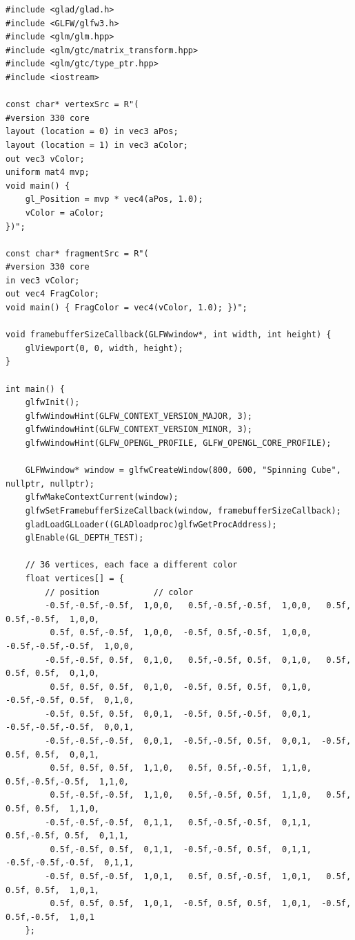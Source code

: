 \documentclass[11pt,a4paper]{article}
\begin{document}
\begin{lstlisting}
#include <glad/glad.h>
#include <GLFW/glfw3.h>
#include <glm/glm.hpp>
#include <glm/gtc/matrix_transform.hpp>
#include <glm/gtc/type_ptr.hpp>
#include <iostream>

const char* vertexSrc = R"(
#version 330 core
layout (location = 0) in vec3 aPos;
layout (location = 1) in vec3 aColor;
out vec3 vColor;
uniform mat4 mvp;
void main() {
    gl_Position = mvp * vec4(aPos, 1.0);
    vColor = aColor;
})";

const char* fragmentSrc = R"(
#version 330 core
in vec3 vColor;
out vec4 FragColor;
void main() { FragColor = vec4(vColor, 1.0); })";

void framebufferSizeCallback(GLFWwindow*, int width, int height) {
    glViewport(0, 0, width, height);
}

int main() {
    glfwInit();
    glfwWindowHint(GLFW_CONTEXT_VERSION_MAJOR, 3);
    glfwWindowHint(GLFW_CONTEXT_VERSION_MINOR, 3);
    glfwWindowHint(GLFW_OPENGL_PROFILE, GLFW_OPENGL_CORE_PROFILE);

    GLFWwindow* window = glfwCreateWindow(800, 600, "Spinning Cube", nullptr, nullptr);
    glfwMakeContextCurrent(window);
    glfwSetFramebufferSizeCallback(window, framebufferSizeCallback);
    gladLoadGLLoader((GLADloadproc)glfwGetProcAddress);
    glEnable(GL_DEPTH_TEST);

    // 36 vertices, each face a different color
    float vertices[] = {
        // position           // color
        -0.5f,-0.5f,-0.5f,  1,0,0,   0.5f,-0.5f,-0.5f,  1,0,0,   0.5f, 0.5f,-0.5f,  1,0,0,
         0.5f, 0.5f,-0.5f,  1,0,0,  -0.5f, 0.5f,-0.5f,  1,0,0,  -0.5f,-0.5f,-0.5f,  1,0,0,
        -0.5f,-0.5f, 0.5f,  0,1,0,   0.5f,-0.5f, 0.5f,  0,1,0,   0.5f, 0.5f, 0.5f,  0,1,0,
         0.5f, 0.5f, 0.5f,  0,1,0,  -0.5f, 0.5f, 0.5f,  0,1,0,  -0.5f,-0.5f, 0.5f,  0,1,0,
        -0.5f, 0.5f, 0.5f,  0,0,1,  -0.5f, 0.5f,-0.5f,  0,0,1,  -0.5f,-0.5f,-0.5f,  0,0,1,
        -0.5f,-0.5f,-0.5f,  0,0,1,  -0.5f,-0.5f, 0.5f,  0,0,1,  -0.5f, 0.5f, 0.5f,  0,0,1,
         0.5f, 0.5f, 0.5f,  1,1,0,   0.5f, 0.5f,-0.5f,  1,1,0,   0.5f,-0.5f,-0.5f,  1,1,0,
         0.5f,-0.5f,-0.5f,  1,1,0,   0.5f,-0.5f, 0.5f,  1,1,0,   0.5f, 0.5f, 0.5f,  1,1,0,
        -0.5f,-0.5f,-0.5f,  0,1,1,   0.5f,-0.5f,-0.5f,  0,1,1,   0.5f,-0.5f, 0.5f,  0,1,1,
         0.5f,-0.5f, 0.5f,  0,1,1,  -0.5f,-0.5f, 0.5f,  0,1,1,  -0.5f,-0.5f,-0.5f,  0,1,1,
        -0.5f, 0.5f,-0.5f,  1,0,1,   0.5f, 0.5f,-0.5f,  1,0,1,   0.5f, 0.5f, 0.5f,  1,0,1,
         0.5f, 0.5f, 0.5f,  1,0,1,  -0.5f, 0.5f, 0.5f,  1,0,1,  -0.5f, 0.5f,-0.5f,  1,0,1
    };


\end{lstlisting}
\end{document}
